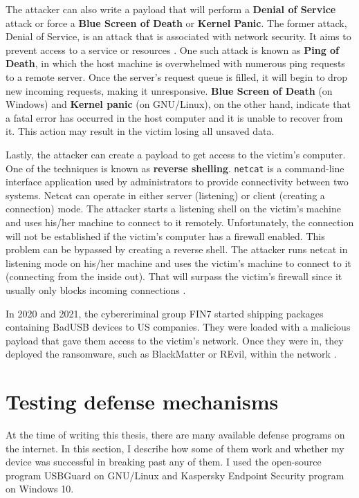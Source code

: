 The attacker can also write a payload that will perform a \textbf{Denial of Service} attack or force a \textbf{Blue Screen of Death} or \textbf{Kernel Panic}. The former attack, Denial of Service, is an attack that is associated with network security. It aims to prevent access to a service or resources \cite{2008Ericson}. One such attack is known as \textbf{Ping of Death}, in which the host machine is overwhelmed with numerous ping requests to a remote server. Once the server's request queue is filled, it will begin to drop new incoming requests, making it unresponsive. \textbf{Blue Screen of Death} (on Windows) and \textbf{Kernel panic} (on GNU/Linux), on the other hand, indicate that a fatal error has occurred in the host computer and it is unable to recover from it. This action may result in the victim losing all unsaved data.

Lastly, the attacker can create a payload to get access to the victim's computer. One of the techniques is known as \textbf{reverse shelling}. \verb|netcat| is a command-line interface application used by administrators to provide connectivity between two systems. Netcat can operate in either server (listening) or client (creating a connection) mode. The attacker starts a listening shell on the victim's machine and uses his/her machine to connect to it remotely. Unfortunately, the connection will not be established if the victim's computer has a firewall enabled. This problem can be bypassed by creating a reverse shell. The attacker runs netcat in listening mode on his/her machine and uses the victim's machine to connect to it (connecting from the inside out). That will surpass the victim's firewall since it usually only blocks incoming connections \cite{WilhelmThomas2010Ppt}.

In 2020 and 2021, the cybercriminal group FIN7 started shipping packages containing BadUSB devices to US companies. They were loaded with a malicious payload that gave them access to the victim's network. Once they were in, they deployed the ransomware, such as BlackMatter or REvil, within the network \cite{gatlan_2022} \cite{ilascu_2020}.


\chapter{Testing defense mechanisms}
\label{ch:testing_defense}
At the time of writing this thesis, there are many available defense programs on the internet. In this section, I describe how some of them work and whether my device was successful in breaking past any of them. I used the open-source program USBGuard on GNU/Linux and Kaspersky Endpoint Security program on Windows 10.

